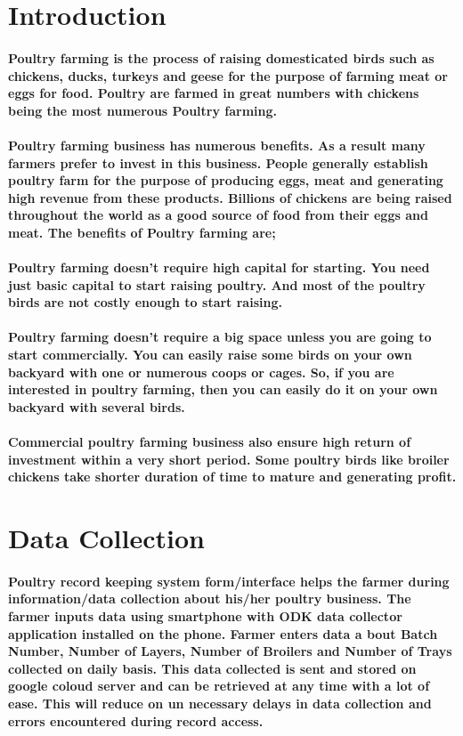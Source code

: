 \documentclass[10pt,a4paper]{article}
\begin{document}
\section{Introduction}
\paragraph{Poultry farming is the process of raising domesticated birds such as chickens, ducks, turkeys and geese for the purpose of farming meat or eggs for food. Poultry are farmed in great numbers with chickens being the most numerous ‎Poultry farming.}
\paragraph{Poultry farming business has numerous benefits. As a result many farmers prefer to invest in this business. People generally establish poultry farm for the purpose of producing eggs, meat and generating high revenue from these products. Billions of chickens are being raised throughout the world as a good source of food from their eggs and meat. The benefits of Poultry farming are;}
\paragraph{Poultry farming doesn’t require high capital for starting. You need just basic capital to start raising poultry. And most of the poultry birds are not costly enough to start raising.}
\paragraph{Poultry farming doesn’t require a big space unless you are going to start commercially. You can easily raise some birds on your own backyard with one or numerous coops or cages. So, if you are interested in poultry farming, then you can easily do it on your own backyard with several birds.}
\paragraph{Commercial poultry farming business also ensure high return of investment within a very short period. Some poultry birds like broiler chickens take shorter duration of time to mature and generating profit.}

\section{Data Collection} 
\paragraph{Poultry record keeping system form/interface helps the farmer during information/data collection about his/her poultry business. The farmer inputs data using smartphone with ODK data collector application installed on the phone. Farmer enters data a bout Batch Number, Number of Layers, Number of Broilers and Number of Trays collected on daily basis. This data collected is sent and stored on google coloud server and can be retrieved at any time with a lot of ease.
This will reduce on un necessary delays in data collection and errors encountered during record access.}
 
\end{document}
